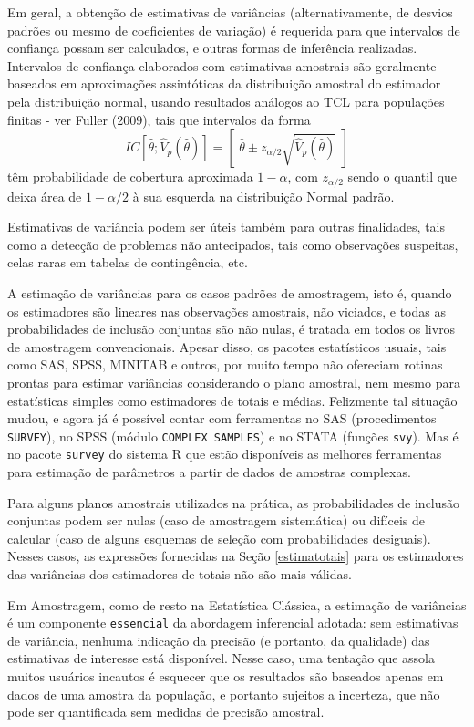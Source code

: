 \documentclass[
  12pt,
  brazilian,
]{book}
\theoremstyle{definition}
\theoremstyle{definition}
\theoremstyle{definition}
\theoremstyle{definition}
\theoremstyle{remark}
\begin{document}
Em geral, a obtenção de estimativas de variâncias (alternativamente, de desvios padrões ou mesmo de coeficientes de variação) é requerida para que intervalos de confiança possam ser calculados, e outras formas de inferência realizadas. Intervalos de confiança elaborados com estimativas amostrais são geralmente
baseados em aproximações assintóticas da distribuição amostral do estimador pela distribuição normal, usando resultados análogos ao TCL para populações finitas - ver Fuller (2009), tais que intervalos da forma
\[
IC\left[ \widehat{\theta };\widehat{V}_{p}\left( \widehat{\theta }\right)
\right] =\left[ \,\, \widehat{\theta } \pm z_{\alpha /2}\sqrt{\widehat{V}_{p} \left( \widehat{\theta} \right) } \,\, \right] 
\]
têm probabilidade de cobertura aproximada \(1-\alpha\), com \(z_{\alpha /2}\) sendo o quantil que deixa área de \(1-\alpha/2\) à sua esquerda na distribuição Normal padrão.

Estimativas de variância podem ser úteis também para outras finalidades, tais como a detecção de problemas não antecipados, tais como observações suspeitas, celas raras em tabelas de contingência, etc.

A estimação de variâncias para os casos padrões de amostragem, isto é, quando os estimadores são lineares nas observações amostrais, não viciados, e todas as probabilidades de inclusão conjuntas são não nulas, é tratada em todos os
livros de amostragem convencionais. Apesar disso, os pacotes estatísticos usuais, tais como SAS, SPSS, MINITAB e outros, por muito tempo não ofereciam rotinas prontas para estimar variâncias considerando o plano amostral, nem mesmo para estatísticas simples como estimadores de totais e médias. Felizmente tal situação mudou, e agora já é possível contar com ferramentas no SAS (procedimentos \texttt{SURVEY}), no SPSS (módulo \texttt{COMPLEX\ SAMPLES}) e no STATA (funções \texttt{svy}). Mas é no pacote \texttt{survey} do sistema R que estão disponíveis as melhores ferramentas para estimação de parâmetros a partir de dados de amostras complexas.

Para alguns planos amostrais utilizados na prática, as probabilidades de inclusão conjuntas podem ser nulas (caso de amostragem sistemática) ou difíceis de calcular (caso de alguns esquemas de seleção com probabilidades desiguais). Nesses casos, as expressões fornecidas na Seção \ref{estimatotais} para os estimadores das variâncias dos estimadores de totais não são mais válidas.

Em Amostragem, como de resto na Estatística Clássica, a estimação de variâncias é um componente \texttt{essencial} da abordagem inferencial adotada: sem estimativas de variância, nenhuma indicação da precisão (e portanto, da qualidade) das estimativas
de interesse está disponível. Nesse caso, uma tentação que assola muitos usuários incautos é esquecer que os resultados são baseados apenas em dados de uma amostra da população, e portanto sujeitos a incerteza, que não pode ser quantificada sem medidas de precisão amostral.
\end{document}
